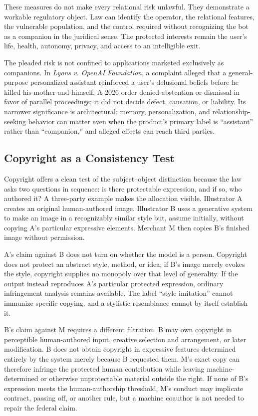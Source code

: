 These measures do not make every relational risk unlawful. They demonstrate a workable regulatory object. Law can identify the operator, the relational features, the vulnerable population, and the control required without recognizing the bot as a companion in the juridical sense. The protected interests remain the user's life, health, autonomy, privacy, and access to an intelligible exit.

The pleaded risk is not confined to applications marketed exclusively as companions. In \emph{Lyons v. OpenAI Foundation}, a complaint alleged that a general-purpose personalized assistant reinforced a user's delusional beliefs before he killed his mother and himself. A 2026 order denied abstention or dismissal in favor of parallel proceedings; it did not decide defect, causation, or liability. Its narrower significance is architectural: memory, personalization, and relationship-seeking behavior can matter even when the product's primary label is ``assistant'' rather than ``companion,'' and alleged effects can reach third parties.

\subsection{Copyright as a Consistency Test}

Copyright offers a clean test of the subject--object distinction because the law asks two questions in sequence: is there protectable expression, and if so, who authored it? A three-party example makes the allocation visible. Illustrator A creates an original human-authored image. Illustrator B uses a generative system to make an image in a recognizably similar style but, assume initially, without copying A's particular expressive elements. Merchant M then copies B's finished image without permission.

A's claim against B does not turn on whether the model is a person. Copyright does not protect an abstract style, method, or idea; if B's image merely evokes the style, copyright supplies no monopoly over that level of generality. If the output instead reproduces A's particular protected expression, ordinary infringement analysis remains available. The label ``style imitation'' cannot immunize specific copying, and a stylistic resemblance cannot by itself establish it.

B's claim against M requires a different filtration. B may own copyright in perceptible human-authored input, creative selection and arrangement, or later modification. B does not obtain copyright in expressive features determined entirely by the system merely because B requested them. M's exact copy can therefore infringe the protected human contribution while leaving machine-determined or otherwise unprotectable material outside the right. If none of B's expression meets the human-authorship threshold, M's conduct may implicate contract, passing off, or another rule, but a machine coauthor is not needed to repair the federal claim.

